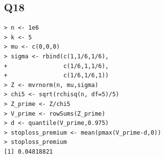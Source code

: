 \subsection*{Q18}

\begin{verbatim}
> n <- 1e6
> k <- 5
> mu <- c(0,0,0)
> sigma <- rbind(c(1,1/6,1/6),
+                c(1/6,1,1/6),
+                c(1/6,1/6,1))
> Z <- mvrnorm(n, mu,sigma)
> chi5 <- sqrt(rchisq(n, df=5)/5)
> Z_prime <- Z/chi5
> V_prime <- rowSums(Z_prime)
> d <- quantile(V_prime,0.975)
> stoploss_premium <- mean(pmax(V_prime-d,0)) 
> stoploss_premium
[1] 0.04818821
\end{verbatim}
